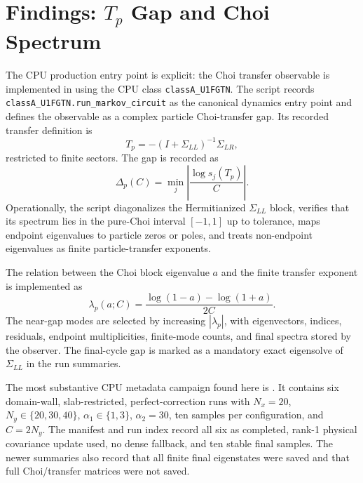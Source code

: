 \documentclass[aps,prb,onecolumn,nofootinbib,superscriptaddress]{revtex4-2}
\begin{document}
\section{Findings: \texorpdfstring{$T_p$}{Tp} Gap and Choi Spectrum}

The CPU production entry point is explicit: the Choi transfer observable is
implemented in 
using the CPU class \texttt{classA\_U1FGTN}.  The script records
\texttt{classA\_U1FGTN.run\_markov\_circuit} as the canonical dynamics entry
point and defines the observable as a complex particle Choi-transfer gap.  Its
recorded transfer definition is
\begin{equation}
  T_p=-(I+\Sigma_{LL})^{-1}\Sigma_{LR},
\end{equation}
restricted to finite sectors.  The gap is recorded as
\begin{equation}
  \Delta_p(C)=\min_j\left|\frac{\log s_j(T_p)}{C}\right|.
\end{equation}
Operationally, the script diagonalizes the Hermitianized
$\Sigma_{LL}$ block, verifies that its spectrum lies in the pure-Choi interval
$[-1,1]$ up to tolerance, maps endpoint eigenvalues to particle zeros or poles,
and treats non-endpoint eigenvalues as finite particle-transfer exponents.

The relation between the Choi block eigenvalue $a$ and the finite transfer
exponent is implemented as
\begin{equation}
  \lambda_p(a;C)=\frac{\log(1-a)-\log(1+a)}{2C}.
\end{equation}
The near-gap modes are selected by increasing $|\lambda_p|$, with eigenvectors,
indices, residuals, endpoint multiplicities, finite-mode counts, and final
spectra stored by the observer.  The final-cycle gap is marked as a mandatory
exact eigensolve of $\Sigma_{LL}$ in the run summaries.

The most substantive CPU metadata campaign found here is
.  It
contains six domain-wall, slab-restricted, perfect-correction runs with
$N_x=20$, $N_y\in\{20,30,40\}$, $\alpha_1\in\{1,3\}$, $\alpha_2=30$, ten
samples per configuration, and $C=2N_y$.  The manifest and run index record all
six as completed, rank-1 physical covariance update used, no dense fallback, and
ten stable final samples.  The newer summaries also record that all finite final
eigenstates were saved and that full Choi/transfer matrices were not saved.
\end{document}
